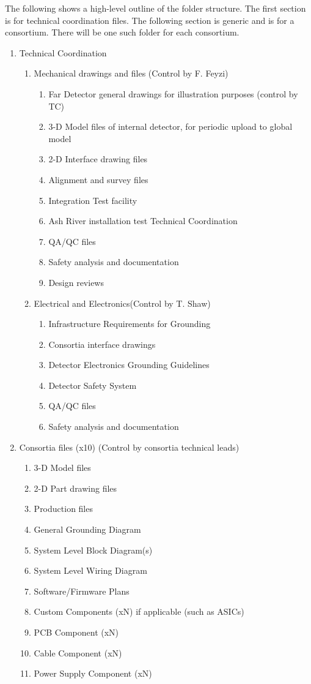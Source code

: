 The following shows a high-level outline of the folder structure. The
first section is for technical coordination files. The following
section is generic and is for a consortium. There will be one such
folder for each consortium.
\begin{enumerate}
 \item Technical Coordination
 \begin{enumerate}
  \item Mechanical drawings and files (Control by F. Feyzi)
  \begin{enumerate}
    \item Far Detector general drawings for illustration purposes (control by TC)
    \item 3-D Model files of internal detector, for periodic upload to global model
    \item 2-D Interface drawing files    
    \item Alignment and survey files
    \item Integration Test facility
    \item Ash River installation test Technical Coordination
    \item QA/QC files
    \item Safety analysis and documentation
    \item Design reviews
  \end{enumerate}
  \item Electrical and Electronics(Control by T. Shaw)
  \begin{enumerate}
    \item Infrastructure Requirements for Grounding
    \item Consortia interface drawings
    \item Detector Electronics Grounding Guidelines
    \item Detector Safety System
    \item QA/QC files
    \item Safety analysis and documentation
  \end{enumerate}
 \end{enumerate}
 \item Consortia files (x10) (Control by consortia technical leads)
 \begin{enumerate}
   \item 3-D Model files
   \item 2-D Part drawing files
   \item Production files
   \item General Grounding Diagram
   \item System Level Block Diagram(s)
   \item System Level Wiring Diagram
   \item Software/Firmware Plans
   \item Custom Components (xN) if applicable (such as ASICs)
   \item PCB Component (xN)
   \item Cable Component (xN)
   \item Power Supply Component (xN)
  \end{enumerate}
\end{enumerate}
